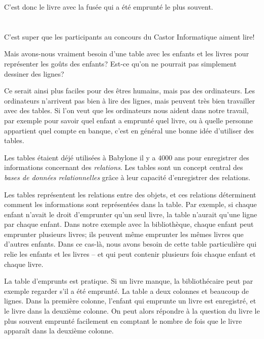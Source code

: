 {{{\centering%
\par}

C’est donc le livre avec la fusée qui a été emprunté le plus souvent.



\section*{\BrochureItsInformatics}
C’est super que les participants au concours du Castor Informatique aiment lire!

Mais avons-nous vraiment besoin d’une table avec les enfants et les livres pour représenter les goûts des enfants? Est-ce qu’on ne pourrait pas simplement dessiner des lignes?

{\centering%
\par}

Ce serait ainsi plus faciles pour des êtres humains, mais pas des ordinateurs. Les ordinateurs n’arrivent pas bien à lire des lignes, mais peuvent très bien travailler avec des tables. Si l’on veut que les ordinateurs nous aident dans notre travail, par exemple pour savoir quel enfant a emprunté quel livre, ou à quelle personne appartient quel compte en banque, c’est en général une bonne idée d’utiliser des tables.

Les tables étaient déjé utilisées à Babylone il y a $4000$ ans pour enregistrer des informations concernant des \emph{relations}.  Les tables sont un concept central des \emph{bases de données relationnelles} grâce à leur capacité d’enregistrer des relations.

Les tables représentent les relations entre des objets, et ces relations déterminent comment les informations sont représentées dans la table. Par exemple, si chaque enfant n’avait le droit d’emprunter qu’un seul livre, la table n’aurait qu’une ligne par chaque enfant. Dans notre exemple avec la bibliothèque, chaque enfant peut emprunter plusieurs livres; ils peuvent même emprunter les mêmes livres que d’autres enfants. Dans ce cas-là, nous avons besoin de cette table particulière qui relie les enfants et les livres – et qui peut contenir plusieurs fois chaque enfant et chaque livre.

La table d’emprunts est pratique. Si un livre manque, la bibliothécaire peut par exemple regarder s’il a été emprunté. La table a deux colonnes et beaucoup de lignes. Dans la première colonne, l’enfant qui emprunte un livre est enregistré, et le livre dans la deuxième colonne. On peut alors répondre à la question du livre le plus souvent emprunté facilement en comptant le nombre de fois que le livre apparaît dans la deuxième colonne.

}}
